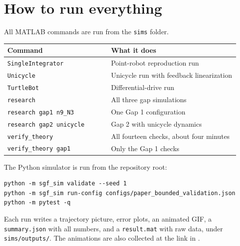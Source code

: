 \documentclass[11pt,a4paper]{article}
\begin{document}
\appendix
\section{How to run everything}

All MATLAB commands are run from the \texttt{sims} folder.

\begin{table}[H]
\centering
\small
\begin{tabular}{@{}p{0.42\linewidth}p{0.52\linewidth}@{}}
\toprule
Command & What it does \\
\midrule
\texttt{SingleIntegrator} & Point-robot reproduction run \\
\texttt{Unicycle} & Unicycle run with feedback linearization \\
\texttt{TurtleBot} & Differential-drive run \\
\texttt{research} & All three gap simulations \\
\texttt{research gap1 n9\_N3} & One Gap 1 configuration \\
\texttt{research gap2 unicycle} & Gap 2 with unicycle dynamics \\
\texttt{verify\_theory} & All fourteen checks, about four minutes \\
\texttt{verify\_theory gap1} & Only the Gap 1 checks \\
\bottomrule
\end{tabular}
\end{table}

The Python simulator is run from the repository root:

\begin{verbatim}
python -m sgf_sim validate --seed 1
python -m sgf_sim run-config configs/paper_bounded_validation.json
python -m pytest -q
\end{verbatim}

Each run writes a trajectory picture, error plots, an animated GIF, a \texttt{summary.json} with all
numbers, and a \texttt{result.mat} with raw data, under \texttt{sims/outputs/}. The animations are
also collected at the link in \cite{animations}.
\end{document}
